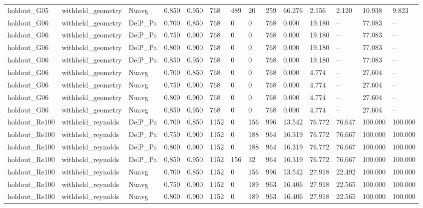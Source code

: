 \begin{tabular}{llllllllllllll}
holdout_G05 & withheld_geometry & Nuavg & 0.850 & 0.950 & 768 & 489 & 20 & 259 & 66.276 & 2.156 & 2.120 & 10.938 & 9.823 \\
holdout_G06 & withheld_geometry & DelP_Pa & 0.700 & 0.850 & 768 & 0 & 0 & 768 & 0.000 & 19.180 & -- & 77.083 & -- \\
holdout_G06 & withheld_geometry & DelP_Pa & 0.750 & 0.900 & 768 & 0 & 0 & 768 & 0.000 & 19.180 & -- & 77.083 & -- \\
holdout_G06 & withheld_geometry & DelP_Pa & 0.800 & 0.900 & 768 & 0 & 0 & 768 & 0.000 & 19.180 & -- & 77.083 & -- \\
holdout_G06 & withheld_geometry & DelP_Pa & 0.850 & 0.950 & 768 & 0 & 0 & 768 & 0.000 & 19.180 & -- & 77.083 & -- \\
holdout_G06 & withheld_geometry & Nuavg & 0.700 & 0.850 & 768 & 0 & 0 & 768 & 0.000 & 4.774 & -- & 27.604 & -- \\
holdout_G06 & withheld_geometry & Nuavg & 0.750 & 0.900 & 768 & 0 & 0 & 768 & 0.000 & 4.774 & -- & 27.604 & -- \\
holdout_G06 & withheld_geometry & Nuavg & 0.800 & 0.900 & 768 & 0 & 0 & 768 & 0.000 & 4.774 & -- & 27.604 & -- \\
holdout_G06 & withheld_geometry & Nuavg & 0.850 & 0.950 & 768 & 0 & 0 & 768 & 0.000 & 4.774 & -- & 27.604 & -- \\
holdout_Re100 & withheld_reynolds & DelP_Pa & 0.700 & 0.850 & 1152 & 0 & 156 & 996 & 13.542 & 76.772 & 76.647 & 100.000 & 100.000 \\
holdout_Re100 & withheld_reynolds & DelP_Pa & 0.750 & 0.900 & 1152 & 0 & 188 & 964 & 16.319 & 76.772 & 76.667 & 100.000 & 100.000 \\
holdout_Re100 & withheld_reynolds & DelP_Pa & 0.800 & 0.900 & 1152 & 0 & 188 & 964 & 16.319 & 76.772 & 76.667 & 100.000 & 100.000 \\
holdout_Re100 & withheld_reynolds & DelP_Pa & 0.850 & 0.950 & 1152 & 156 & 32 & 964 & 16.319 & 76.772 & 76.667 & 100.000 & 100.000 \\
holdout_Re100 & withheld_reynolds & Nuavg & 0.700 & 0.850 & 1152 & 0 & 156 & 996 & 13.542 & 27.918 & 22.492 & 100.000 & 100.000 \\
holdout_Re100 & withheld_reynolds & Nuavg & 0.750 & 0.900 & 1152 & 0 & 189 & 963 & 16.406 & 27.918 & 22.565 & 100.000 & 100.000 \\
holdout_Re100 & withheld_reynolds & Nuavg & 0.800 & 0.900 & 1152 & 0 & 189 & 963 & 16.406 & 27.918 & 22.565 & 100.000 & 100.000 \\

\end{tabular}
